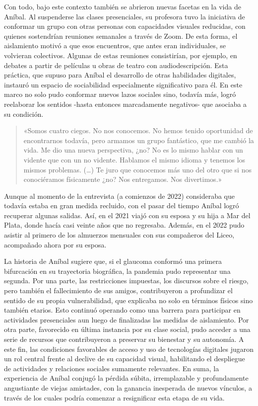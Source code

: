 Con todo, bajo este contexto también se abrieron nuevas facetas en la vida de Aníbal. Al suspenderse las clases presenciales, su profesora tuvo la iniciativa de conformar un grupo con otras personas con capacidades visuales reducidas, con quienes sostendrían reuniones semanales a través de Zoom. De esta forma, el aislamiento motivó a que esos encuentros, que antes eran individuales, se volvieran colectivos. Algunas de estas reuniones consistirían, por ejemplo, en debates a partir de películas u obras de teatro con audiodescripción. Esta práctica, que supuso para Aníbal el desarrollo de otras habilidades digitales, instauró un espacio de sociabilidad especialmente significativo para él. En este marco no solo pudo conformar nuevos lazos sociales sino, todavía más, logró reelaborar los sentidos -hasta entonces marcadamente negativos- que asociaba a su condición.

\begin{quote}
«Somos cuatro ciegos. No nos conocemos. No hemos tenido oportunidad de encontrarnos todavía, pero armamos un grupo fantástico, que me cambió la vida. Me dio una nueva perspectiva, ¿no? No es lo mismo hablar con un vidente que con un no vidente. Hablamos el mismo idioma y tenemos los mismos problemas. (\ldots) Te juro que conocemos más uno del otro que si nos conociéramos físicamente ¿no? Nos entregamos. Nos divertimos.»
\end{quote}

Aunque al momento de la entrevista (a comienzos de 2022) consideraba que todavía estaba en gran medida recluido, con el pasar del tiempo Aníbal logró recuperar algunas salidas. Así, en el 2021 viajó con su esposa y su hija a Mar del Plata, donde hacía casi veinte años que no regresaba. Además, en el 2022 pudo asistir al primero de los almuerzos mensuales con sus compañeros del Liceo, acompañado ahora por su esposa.

La historia de Aníbal sugiere que, si el glaucoma conformó una primera bifurcación en su trayectoria biográfica, la pandemia pudo representar una segunda. Por una parte, las restricciones impuestas, los discursos sobre el riesgo, pero también el fallecimiento de sus amigos, contribuyeron a profundizar el sentido de su propia vulnerabilidad, que explicaba no solo en términos físicos sino también etarios. Esto continuó operando como una barrera para participar en actividades presenciales aun luego de finalizadas las medidas de aislamiento. Por otra parte, favorecido en última instancia por su clase social, pudo acceder a una serie de recursos que contribuyeron a preservar su bienestar y su autonomía. A este fin, las condiciones favorables de acceso y uso de tecnologías digitales jugaron un rol central frente al declive de su capacidad visual, habilitando el despliegue de actividades y relaciones sociales sumamente relevantes. En suma, la experiencia de Aníbal conjugó la pérdida súbita, irremplazable y profundamente angustiante de viejas amistades, con la ganancia inesperada de nuevos vínculos, a través de los cuales podría comenzar a resignificar esta etapa de su vida.

